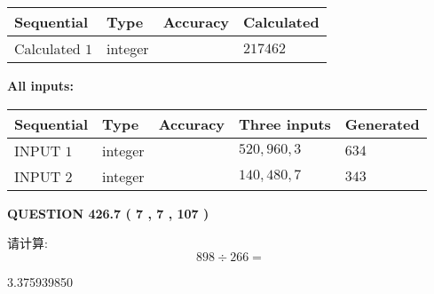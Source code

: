 \documentclass{ctexart}
\begin{document}
   
   
   
\noindent{}
   
   
  
  
\noindent\begin{tabular}{|l|l|l|l|}
\hline
 Sequential & Type & Accuracy & Calculated \\ 
\hline
 
 
  Calculated $  1 $ & integer &  & 
  $ 217462 $ 
 \\  \hline  
 \end{tabular}
   
   
   
   
\noindent\vspace{0.1in}\hspace{-0.08in} {\textbf{\Large{All inputs: }}}
   
   
  
  
\noindent\begin{tabular}{|l|l|l|l|l|}
\hline
 Sequential & Type & Accuracy & Three inputs & Generated \\ 
\hline
 
 
  INPUT $  1 $ & integer &  & $
 520
 , 
 960
 , 
 3
 $ & $ 634 $ 
 \\  \hline  
 
 
  INPUT $  2 $ & integer &  & $
 140
 , 
 480
 , 
 7
 $ & $ 343 $ 
 \\  \hline  
 \end{tabular}
   
   
  
\vspace{0.2in}
  
{\textbf{\Large{QUESTION
426.7 
 ( 7 , 7 , 107 )
}}}
  
  
 
请计算:
\begin{equation}
898  \div    %
266 = \nonumber
\end{equation}
 
 
 
\noindent{}
 
 

3.375939850
 
 
\noindent{}
 
 

 
 
 
\noindent{}
 
\end{document}
